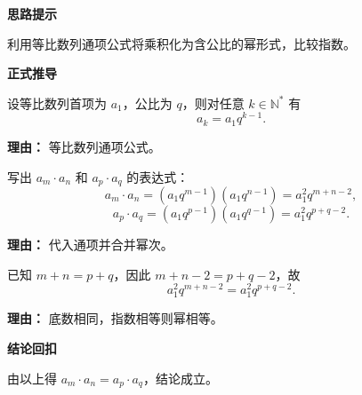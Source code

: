 \begin{proofbox}
\textbf{\textcolor{CProof}{思路提示}}

利用等比数列通项公式将乘积化为含公比的幂形式，比较指数。

\medskip
\textbf{\textcolor{CProof}{正式推导}}
\begin{description}[style=nextline, leftmargin=2.8em, labelsep=0.5em, itemsep=0.55em]
    \item[\textbf{步骤一（设通项）：}] 设等比数列首项为 $a_1$，公比为 $q$，则对任意 $k\in\mathbb{N}^*$ 有
    \[
    a_k = a_1 q^{k-1}.
    \]
    \par\textbf{理由：} 等比数列通项公式。
    
    \item[\textbf{步骤二（写乘积）：}] 写出 $a_m\cdot a_n$ 和 $a_p\cdot a_q$ 的表达式：
    \[
    a_m\cdot a_n = (a_1 q^{m-1})(a_1 q^{n-1}) = a_1^2 q^{m+n-2},
    \]
    \[
    a_p\cdot a_q = (a_1 q^{p-1})(a_1 q^{q-1}) = a_1^2 q^{p+q-2}.
    \]
    \par\textbf{理由：} 代入通项并合并幂次。
    
    \item[\textbf{步骤三（比较指数）：}] 已知 $m+n = p+q$，因此 $m+n-2 = p+q-2$，故
    \[
    a_1^2 q^{m+n-2} = a_1^2 q^{p+q-2}.
    \]
    \par\textbf{理由：} 底数相同，指数相等则幂相等。
\end{description}

\medskip
\textbf{\textcolor{CProof}{结论回扣}}

由以上得 $a_m\cdot a_n = a_p\cdot a_q$，结论成立。
\end{proofbox}
